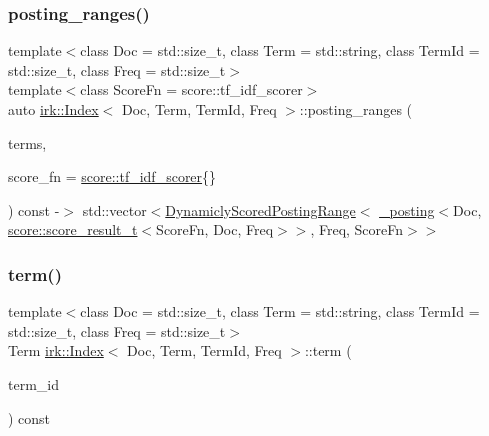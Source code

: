 \subsubsection{\texorpdfstring{posting\+\_\+ranges()}{posting\_ranges()}}
{\footnotesize\ttfamily template$<$class Doc  = std\+::size\+\_\+t, class Term  = std\+::string, class Term\+Id  = std\+::size\+\_\+t, class Freq  = std\+::size\+\_\+t$>$ \\
template$<$class Score\+Fn  = score\+::tf\+\_\+idf\+\_\+scorer$>$ \\
auto \mbox{\hyperlink{classirk_1_1Index}{irk\+::\+Index}}$<$ Doc, Term, Term\+Id, Freq $>$\+::posting\+\_\+ranges (\begin{DoxyParamCaption}\item[{const std\+::vector$<$ std\+::string $>$ \&}]{terms,  }\item[{Score\+Fn}]{score\+\_\+fn = {\ttfamily \mbox{\hyperlink{structirk_1_1score_1_1tf__idf__scorer}{score\+::tf\+\_\+idf\+\_\+scorer}}\{\}} }\end{DoxyParamCaption}) const -\/$>$ std\+::vector$<$\mbox{\hyperlink{classirk_1_1DynamiclyScoredPostingRange}{Dynamicly\+Scored\+Posting\+Range}}$<$
            \mbox{\hyperlink{structirk_1_1__posting}{\+\_\+posting}}$<$Doc, \mbox{\hyperlink{namespaceirk_1_1score_af4a2c84b3548a4ac12aac3862bc94875}{score\+::score\+\_\+result\+\_\+t}}$<$Score\+Fn, Doc, Freq$>$$>$,
            Freq,
            Score\+Fn$>$$>$
    \hspace{0.3cm}{\ttfamily [inline]}}

\mbox{\label{classirk_1_1Index_a359813adc185edff595b8adbd743a21c}} 
\subsubsection{\texorpdfstring{term()}{term()}}
{\footnotesize\ttfamily template$<$class Doc  = std\+::size\+\_\+t, class Term  = std\+::string, class Term\+Id  = std\+::size\+\_\+t, class Freq  = std\+::size\+\_\+t$>$ \\
Term \mbox{\hyperlink{classirk_1_1Index}{irk\+::\+Index}}$<$ Doc, Term, Term\+Id, Freq $>$\+::term (\begin{DoxyParamCaption}\item[{Term\+Id}]{term\+\_\+id }\end{DoxyParamCaption}) const\hspace{0.3cm}{\ttfamily [inline]}}

